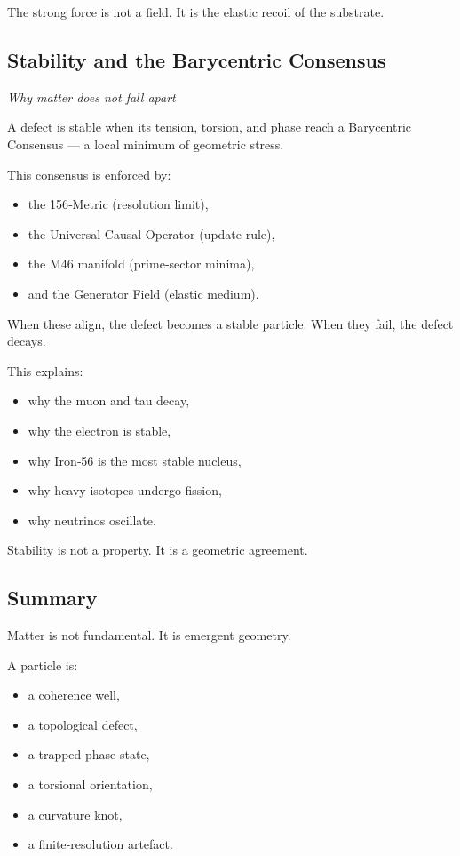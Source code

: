 \documentclass[reprint,amsmath,amssymb,aps,prl,floatfix]{revtex4-2}
\begin{document}
\begin{itemize}
The strong force is not a field.  
It is the elastic recoil of the substrate.

\subsection{Stability and the Barycentric Consensus}
\textit{Why matter does not fall apart}

A defect is stable when its tension, torsion, and phase reach a Barycentric Consensus — a local minimum of geometric stress.
\medskip

This consensus is enforced by:
\begin{itemize}
\item the 156‑Metric (resolution limit),  
\item the Universal Causal Operator (update rule),  
\item the M46 manifold (prime‑sector minima),  
\item and the Generator Field (elastic medium).
\end{itemize}
\medskip

When these align, the defect becomes a stable particle.  
When they fail, the defect decays.
\medskip

This explains:
\begin{itemize}
\item why the muon and tau decay,  
\item why the electron is stable,  
\item why Iron‑56 is the most stable nucleus,  
\item why heavy isotopes undergo fission,  
\item why neutrinos oscillate.
\end{itemize}

Stability is not a property.  
It is a geometric agreement.
\medskip

\subsection{Summary}

Matter is not fundamental.  
It is emergent geometry.
\medskip

A particle is:

\begin{itemize}
\item a coherence well,  
\item a topological defect,  
\item a trapped phase state,  
\item a torsional orientation,  
\item a curvature knot,  
\item a finite‑resolution artefact.
\end{itemize}


\end{itemize}
\end{document}
